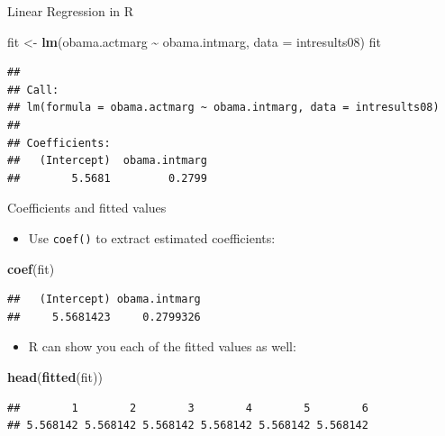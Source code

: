 \documentclass[
  ignorenonframetext,
]{beamer}
\newenvironment{Shaded}{\begin{snugshade}}{\end{snugshade}}
\newcommand{\AttributeTok}[1]{\textcolor[rgb]{0.13,0.29,0.53}{#1}}
\newcommand{\FunctionTok}[1]{\textcolor[rgb]{0.13,0.29,0.53}{\textbf{#1}}}
\newcommand{\NormalTok}[1]{#1}
\newcommand{\OtherTok}[1]{\textcolor[rgb]{0.56,0.35,0.01}{#1}}
\newcommand{\SpecialCharTok}[1]{\textcolor[rgb]{0.81,0.36,0.00}{\textbf{#1}}}
\providecommand{\tightlist}{%
  \setlength{\itemsep}{0pt}\setlength{\parskip}{0pt}}
\begin{document}
\begin{frame}[fragile]{Linear Regression in R}
\label{linear-regression-in-r-1}
\small

\begin{Shaded}
\begin{Highlighting}[]
\NormalTok{fit }\OtherTok{\textless{}{-}} \FunctionTok{lm}\NormalTok{(obama.actmarg }\SpecialCharTok{\textasciitilde{}}\NormalTok{ obama.intmarg, }\AttributeTok{data =}\NormalTok{ intresults08)}
\NormalTok{fit}
\end{Highlighting}
\end{Shaded}

\begin{verbatim}
## 
## Call:
## lm(formula = obama.actmarg ~ obama.intmarg, data = intresults08)
## 
## Coefficients:
##   (Intercept)  obama.intmarg  
##        5.5681         0.2799
\end{verbatim}
\end{frame}

\begin{frame}[fragile]{Coefficients and fitted values}
\label{coefficients-and-fitted-values}
\begin{itemize}
\tightlist
\item
  Use \texttt{coef()} to extract estimated coefficients:
\end{itemize}

\begin{Shaded}
\begin{Highlighting}[]
\FunctionTok{coef}\NormalTok{(fit)}
\end{Highlighting}
\end{Shaded}

\begin{verbatim}
##   (Intercept) obama.intmarg 
##     5.5681423     0.2799326
\end{verbatim}

\begin{itemize}
\tightlist
\item
  R can show you each of the fitted values as well:
\end{itemize}

\begin{Shaded}
\begin{Highlighting}[]
\FunctionTok{head}\NormalTok{(}\FunctionTok{fitted}\NormalTok{(fit))}
\end{Highlighting}
\end{Shaded}

\begin{verbatim}
##        1        2        3        4        5        6 
## 5.568142 5.568142 5.568142 5.568142 5.568142 5.568142
\end{verbatim}
\end{frame}
\end{document}
